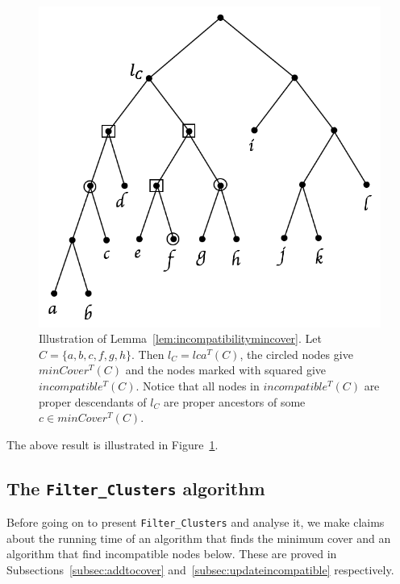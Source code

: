 \documentclass{article}
\begin{document}
    \begin{figure}[h]
        \includegraphics[scale=0.5]{incompatibility}
        \centering
        \caption{Illustration of Lemma~\ref{lem:incompatibilitymincover}. Let $C = \{a, b, c, f, g, h\}$. Then $l_C = lca^T(C)$, the circled nodes give $minCover^{T}(C)$ and the nodes marked with squared give $incompatible^T(C)$. Notice that all nodes in $incompatible^T(C)$ are proper descendants of $l_C$ are proper ancestors of some $c \in minCover^{T}(C)$.}
        \label{fig:incompatibility}
    \end{figure}

    The above result is illustrated in Figure~\ref{fig:incompatibility}.

    \subsection{The \texttt{Filter\_Clusters} algorithm}
    \label{subsec:filterclusters}

    Before going on to present \texttt{Filter\_Clusters} and analyse it, we make claims about the running time of an algorithm that finds the minimum cover and an algorithm that find incompatible nodes below. These are proved in Subsections~\ref{subsec:addtocover} and~\ref{subsec:updateincompatible} respectively.
    \newline
\end{document}
